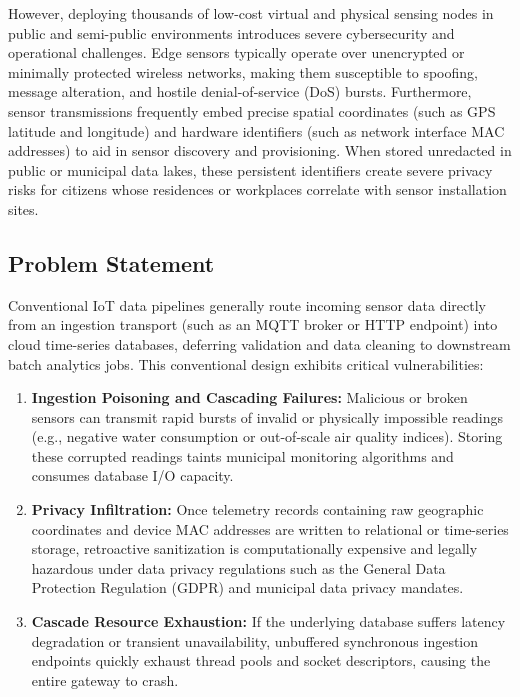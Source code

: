 \documentclass[a4paper]{article}
\begin{document}
However, deploying thousands of low-cost virtual and physical sensing nodes in public and semi-public environments introduces severe cybersecurity and operational challenges. Edge sensors typically operate over unencrypted or minimally protected wireless networks, making them susceptible to spoofing, message alteration, and hostile denial-of-service (DoS) bursts. Furthermore, sensor transmissions frequently embed precise spatial coordinates (such as GPS latitude and longitude) and hardware identifiers (such as network interface MAC addresses) to aid in sensor discovery and provisioning. When stored unredacted in public or municipal data lakes, these persistent identifiers create severe privacy risks for citizens whose residences or workplaces correlate with sensor installation sites.

\subsection{Problem Statement}
Conventional IoT data pipelines generally route incoming sensor data directly from an ingestion transport (such as an MQTT broker or HTTP endpoint) into cloud time-series databases, deferring validation and data cleaning to downstream batch analytics jobs. This conventional design exhibits critical vulnerabilities:
\begin{enumerate}[label=(\alph*)]
    \item \textbf{Ingestion Poisoning and Cascading Failures:} Malicious or broken sensors can transmit rapid bursts of invalid or physically impossible readings (e.g., negative water consumption or out-of-scale air quality indices). Storing these corrupted readings taints municipal monitoring algorithms and consumes database I/O capacity.
    \item \textbf{Privacy Infiltration:} Once telemetry records containing raw geographic coordinates and device MAC addresses are written to relational or time-series storage, retroactive sanitization is computationally expensive and legally hazardous under data privacy regulations such as the General Data Protection Regulation (GDPR) and municipal data privacy mandates.
    \item \textbf{Cascade Resource Exhaustion:} If the underlying database suffers latency degradation or transient unavailability, unbuffered synchronous ingestion endpoints quickly exhaust thread pools and socket descriptors, causing the entire gateway to crash.
\end{enumerate}
\end{document}
